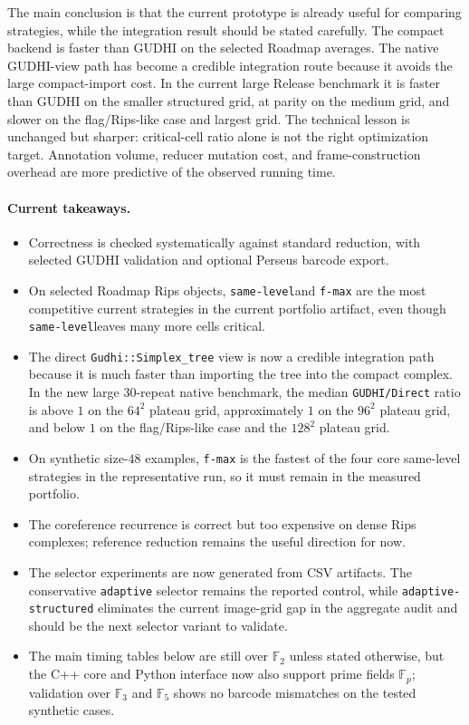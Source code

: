 \documentclass[11pt]{article}
\newcommand{\Ftwo}{\mathbb{F}_2}
\newcommand{\Fp}{\mathbb{F}_p}
\newcommand{\slred}{\texttt{same-level}}
\begin{document}
The main conclusion is that the current prototype is already useful for comparing
strategies, while the integration result should be stated carefully.  The compact backend
is faster than GUDHI on the selected Roadmap averages.  The native GUDHI-view path has
become a credible integration route because it avoids the large compact-import cost.  In
the current large Release benchmark it is faster than GUDHI on the smaller structured
grid, at parity on the medium grid, and slower on the flag/Rips-like case and largest
grid.  The technical lesson is unchanged but sharper: critical-cell ratio alone is not
the right optimization target.  Annotation volume, reducer mutation cost, and
frame-construction overhead are more predictive of the observed running time.

\paragraph{Current takeaways.}
\begin{itemize}
  \item Correctness is checked systematically against standard reduction, with selected
        GUDHI validation and optional Perseus barcode export.
  \item On selected Roadmap Rips objects, \slred and
        \texttt{f-max} are the most competitive current strategies in the current
        portfolio artifact, even though
        \slred leaves many more cells critical.
  \item The direct \texttt{Gudhi::Simplex\_tree} view is now a credible integration path
        because it is much faster than importing the tree into the compact complex.
        In the new large 30-repeat native benchmark, the median
        \texttt{GUDHI/Direct} ratio is above $1$ on the $64^2$ plateau grid,
        approximately $1$ on the $96^2$ plateau grid, and below $1$ on the
        flag/Rips-like case and the $128^2$ plateau grid.
  \item On synthetic size-$48$ examples, \texttt{f-max} is the fastest of the four core
        same-level strategies in the representative run, so it must remain in the measured
        portfolio.
  \item The coreference recurrence is correct but too expensive on dense Rips complexes;
        reference reduction remains the useful direction for now.
  \item The selector experiments are now generated from CSV artifacts.  The conservative
        \texttt{adaptive} selector remains the reported control, while
        \texttt{adaptive-structured} eliminates the current image-grid gap in the aggregate
        audit and should be the next selector variant to validate.
  \item The main timing tables below are still over $\Ftwo$ unless stated otherwise, but
        the C++ core and Python interface now also support prime fields $\Fp$; validation
        over $\mathbb{F}_3$ and $\mathbb{F}_5$ shows no barcode mismatches on the tested
        synthetic cases.
\end{itemize}
\end{document}
